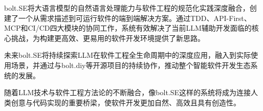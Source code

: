 bolt.SE将大语言模型的自然语言处理能力与软件工程的规范化实践深度融合，创建了一个从需求描述到可运行软件的端到端解决方案。通过TDD、API-First、MCP和CI/CD四大模块的协同工作，系统有效解决了当前LLM辅助开发面临的核心挑战，为构建更高效、更易用的软件开发环境提供了新思路。

未来bolt.SE将持续探索LLM在软件工程全生命周期中的深度应用，融入到实际使用场景，并通过与bolt.diy等开源项目的持续协作，推动整个智能软件开发生态系统的发展。

随着LLM技术与软件工程方法论的不断融合，像bolt.SE这样的系统将成为连接人类创意与代码实现的重要桥梁，使软件开发更加自然、高效且具有创造性。 